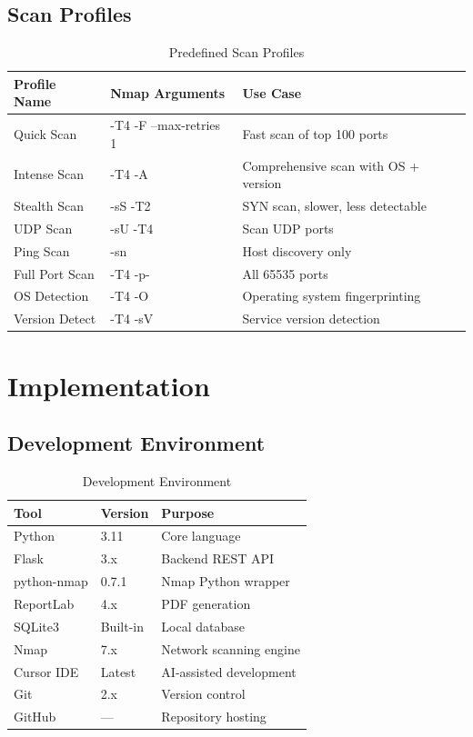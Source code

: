 \documentclass[12pt, a4paper]{report}
\begin{document}
\section{Scan Profiles}
\begin{table}[H]
  \centering
  \caption{Predefined Scan Profiles}
  \label{tab:scan-profiles}
  \begin{tabularx}{\textwidth}{@{}X X X@{}}
    \toprule
    \textbf{Profile Name} & \textbf{Nmap Arguments} & \textbf{Use Case} \\
    \midrule
    Quick Scan & -T4 -F --max-retries 1 & Fast scan of top 100 ports \\
    Intense Scan & -T4 -A & Comprehensive scan with OS + version \\
    Stealth Scan & -sS -T2 & SYN scan, slower, less detectable \\
    UDP Scan & -sU -T4 & Scan UDP ports \\
    Ping Scan & -sn & Host discovery only \\
    Full Port Scan & -T4 -p- & All 65535 ports \\
    OS Detection & -T4 -O & Operating system fingerprinting \\
    Version Detect & -T4 -sV & Service version detection \\
    \bottomrule
  \end{tabularx}
\end{table}

\clearpage
\chapter{Implementation}

\section{Development Environment}
\begin{table}[H]
  \centering
  \caption{Development Environment}
  \label{tab:dev-env}
  \begin{tabularx}{\textwidth}{@{}l l X@{}}
    \toprule
    \textbf{Tool} & \textbf{Version} & \textbf{Purpose} \\
    \midrule
    Python & 3.11 & Core language \\
    Flask & 3.x & Backend REST API \\
    python-nmap & 0.7.1 & Nmap Python wrapper \\
    ReportLab & 4.x & PDF generation \\
    SQLite3 & Built-in & Local database \\
    Nmap & 7.x & Network scanning engine \\
    Cursor IDE & Latest & AI-assisted development \\
    Git & 2.x & Version control \\
    GitHub & --- & Repository hosting \\
    \bottomrule
  \end{tabularx}
\end{table}
\end{document}
